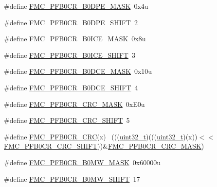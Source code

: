 \begin{DoxyCompactItemize}
\item 
\#define \hyperlink{group___f_m_c___register___masks_gaff35af9c8bc3c5cf2f6bf9dd76253a02}{F\+M\+C\+\_\+\+P\+F\+B0\+C\+R\+\_\+\+B0\+D\+P\+E\+\_\+\+M\+A\+SK}~0x4u
\item 
\#define \hyperlink{group___f_m_c___register___masks_gabe5b35383e6d2198f45bc66429b0ce61}{F\+M\+C\+\_\+\+P\+F\+B0\+C\+R\+\_\+\+B0\+D\+P\+E\+\_\+\+S\+H\+I\+FT}~2
\item 
\#define \hyperlink{group___f_m_c___register___masks_ga093ec774220ef7557784c2cea999502e}{F\+M\+C\+\_\+\+P\+F\+B0\+C\+R\+\_\+\+B0\+I\+C\+E\+\_\+\+M\+A\+SK}~0x8u
\item 
\#define \hyperlink{group___f_m_c___register___masks_ga7595313d5ea6aa0ddb4fa755bad06110}{F\+M\+C\+\_\+\+P\+F\+B0\+C\+R\+\_\+\+B0\+I\+C\+E\+\_\+\+S\+H\+I\+FT}~3
\item 
\#define \hyperlink{group___f_m_c___register___masks_ga2ef77cab94225466d9301d03fc02b432}{F\+M\+C\+\_\+\+P\+F\+B0\+C\+R\+\_\+\+B0\+D\+C\+E\+\_\+\+M\+A\+SK}~0x10u
\item 
\#define \hyperlink{group___f_m_c___register___masks_gaf25cde827cdccda0268d84a381fb8ab2}{F\+M\+C\+\_\+\+P\+F\+B0\+C\+R\+\_\+\+B0\+D\+C\+E\+\_\+\+S\+H\+I\+FT}~4
\item 
\#define \hyperlink{group___f_m_c___register___masks_ga2ba15c609c4ff7e43ed4d6119b704ddd}{F\+M\+C\+\_\+\+P\+F\+B0\+C\+R\+\_\+\+C\+R\+C\+\_\+\+M\+A\+SK}~0x\+E0u
\item 
\#define \hyperlink{group___f_m_c___register___masks_ga45e4e9c3fff1241f2d1fffa05825efc8}{F\+M\+C\+\_\+\+P\+F\+B0\+C\+R\+\_\+\+C\+R\+C\+\_\+\+S\+H\+I\+FT}~5
\item 
\#define \hyperlink{group___f_m_c___register___masks_ga8afa628555e68cad80bdb5cec8f46a27}{F\+M\+C\+\_\+\+P\+F\+B0\+C\+R\+\_\+\+C\+RC}(x)                                            ~(((\hyperlink{_p_e___types_8h_a33594304e786b158f3fb30289278f5af}{uint32\+\_\+t})(((\hyperlink{_p_e___types_8h_a33594304e786b158f3fb30289278f5af}{uint32\+\_\+t})(x))$<$$<$\hyperlink{group___f_m_c___register___masks_ga45e4e9c3fff1241f2d1fffa05825efc8}{F\+M\+C\+\_\+\+P\+F\+B0\+C\+R\+\_\+\+C\+R\+C\+\_\+\+S\+H\+I\+FT}))\&\hyperlink{group___f_m_c___register___masks_ga2ba15c609c4ff7e43ed4d6119b704ddd}{F\+M\+C\+\_\+\+P\+F\+B0\+C\+R\+\_\+\+C\+R\+C\+\_\+\+M\+A\+SK})
\item 
\#define \hyperlink{group___f_m_c___register___masks_gac03a4c507c37a0a18312d87c64e1ec5d}{F\+M\+C\+\_\+\+P\+F\+B0\+C\+R\+\_\+\+B0\+M\+W\+\_\+\+M\+A\+SK}~0x60000u
\item 
\#define \hyperlink{group___f_m_c___register___masks_gacfb3dd701c01e307d578e1fd0d048149}{F\+M\+C\+\_\+\+P\+F\+B0\+C\+R\+\_\+\+B0\+M\+W\+\_\+\+S\+H\+I\+FT}~17
$$
\end{DoxyCompactItemize}
